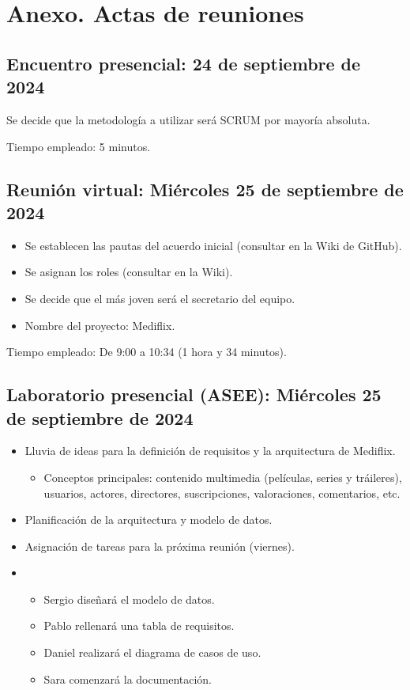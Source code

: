 \documentclass[../main.tex]{subfiles}
\begin{document}
\section{Anexo. Actas de reuniones}

\subsection{Encuentro presencial: 24 de septiembre de 2024}
Se decide que la metodología a utilizar será SCRUM por mayoría absoluta.\par
Tiempo empleado: 5 minutos.

\subsection{Reunión virtual: Miércoles 25 de septiembre de 2024}
\begin{itemize}
    \item Se establecen las pautas del acuerdo inicial (consultar en la Wiki de GitHub).
    \item Se asignan los roles (consultar en la Wiki).
    \item Se decide que el más joven será el secretario del equipo.
    \item Nombre del proyecto: Mediflix.
\end{itemize}
Tiempo empleado: De 9:00 a 10:34 (1 hora y 34 minutos).

\subsection{Laboratorio presencial (ASEE): Miércoles 25 de septiembre de 2024}
\begin{itemize}
    \item Lluvia de ideas para la definición de requisitos y la arquitectura de Mediflix.
    \begin{itemize}
        \item Conceptos principales: contenido multimedia (películas, series y tráileres), usuarios, actores, directores, suscripciones, valoraciones, comentarios, etc.
    \end{itemize}
    \item Planificación de la arquitectura y modelo de datos.
    \item Asignación de tareas para la próxima reunión (viernes).
    \item \begin{itemize}
        \item Sergio diseñará el modelo de datos.
        \item Pablo rellenará una tabla de requisitos.
        \item Daniel realizará el diagrama de casos de uso.
        \item Sara comenzará la documentación.
    \end{itemize}
\end{itemize}
\end{document}

